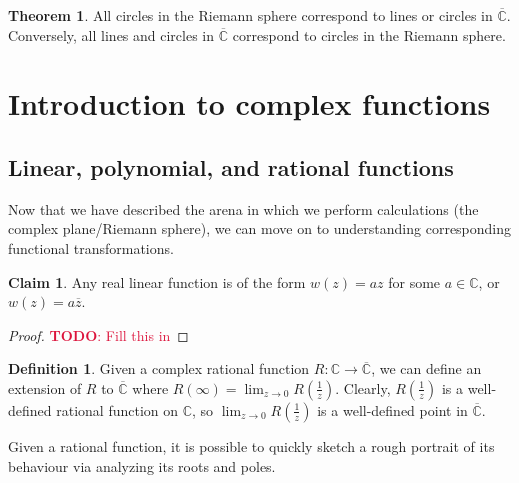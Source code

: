 \documentclass[aps,pra,showpacs,notitlepage,onecolumn,superscriptaddress,nofootinbib]{revtex4-1}
\newcommand{\pop}[1]{\textcolor{crimson}{#1}}
\theoremstyle{definition}
\newtheorem{definition}{Definition}[section]
\newtheorem{theorem}{Theorem}[section]
\newtheorem{claim}{Claim}[section]
\begin{document}
\begin{theorem}
  All circles in the Riemann sphere correspond to lines or circles in $\overline{\mathbb{C}}$. Conversely, all lines and
  circles in $\overline{\mathbb{C}}$ correspond to circles in the Riemann sphere.
\end{theorem}

\section{Introduction to complex functions}

\subsection{Linear, polynomial, and rational functions}

\noindent Now that we have described the arena in which we perform calculations (the complex plane/Riemann sphere), we can move on to understanding corresponding functional transformations.

\begin{claim}
  Any real linear function is of the form $w(z) = az$ for some $a \in \mathbb{C}$, or $w(z) = a\overline{z}$.
\end{claim}

\begin{proof}
  \pop{\textbf{TODO}: Fill this in}
\end{proof}

\begin{definition}
  Given a complex rational function $R : \mathbb{C} \rightarrow \overline{\mathbb{C}}$, we can define an extension of $R$ to $\overline{\mathbb{C}}$ where $R(\infty) = \lim_{z \to 0} R\left(\frac{1}{z}\right)$. Clearly, $R\left(\frac{1}{z}\right)$ is a well-defined
  rational function on $\mathbb{C}$, so $\lim_{z \to 0} R\left( \frac{1}{z} \right)$ is a well-defined point in $\overline{\mathbb{C}}$.
  \end{definition}

Given a rational function, it is possible to quickly sketch a rough portrait of its behaviour via analyzing its roots and poles.
\end{document}
